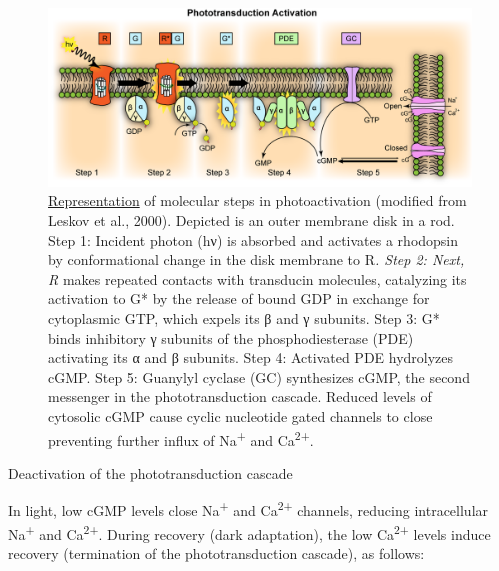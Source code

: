 \begin{figure}

{\centering \includegraphics[width=0.7\linewidth]{./figures/visual/Phototransduction} 

}

\caption{\href{https://commons.wikimedia.org/wiki/File:Phototransduction.png}{Representation} of molecular steps in photoactivation (modified from Leskov et al., 2000). Depicted is an outer membrane disk in a rod. Step 1: Incident photon (hν) is absorbed and activates a rhodopsin by conformational change in the disk membrane to R\emph{. Step 2: Next, R} makes repeated contacts with transducin molecules, catalyzing its activation to G* by the release of bound GDP in exchange for cytoplasmic GTP, which expels its β and γ subunits. Step 3: G* binds inhibitory γ subunits of the phosphodiesterase (PDE) activating its α and β subunits. Step 4: Activated PDE hydrolyzes cGMP. Step 5: Guanylyl cyclase (GC) synthesizes cGMP, the second messenger in the phototransduction cascade. Reduced levels of cytosolic cGMP cause cyclic nucleotide gated channels to close preventing further influx of Na\textsuperscript{+} and Ca\textsuperscript{2+}.}\label{fig:molsteps}
\end{figure}

Deactivation of the phototransduction cascade

In light, low cGMP levels close Na\textsuperscript{+} and Ca\textsuperscript{2+} channels, reducing intracellular Na\textsuperscript{+} and Ca\textsuperscript{2+}. During recovery (dark adaptation), the low Ca\textsuperscript{2+} levels induce recovery (termination of the phototransduction cascade), as follows:

